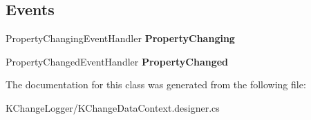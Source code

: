 \subsection*{Events}
\begin{DoxyCompactItemize}
\item 
\hypertarget{class_k_change_logger_1_1_project___file_aed9f634a58b9c667992643788a259e4c}{Property\-Changing\-Event\-Handler {\bfseries Property\-Changing}}\label{class_k_change_logger_1_1_project___file_aed9f634a58b9c667992643788a259e4c}

\item 
\hypertarget{class_k_change_logger_1_1_project___file_ad236225560838063f51017d5573c26f0}{Property\-Changed\-Event\-Handler {\bfseries Property\-Changed}}\label{class_k_change_logger_1_1_project___file_ad236225560838063f51017d5573c26f0}

\end{DoxyCompactItemize}


The documentation for this class was generated from the following file\-:\begin{DoxyCompactItemize}
\item 
K\-Change\-Logger/K\-Change\-Data\-Context.\-designer.\-cs\end{DoxyCompactItemize}
